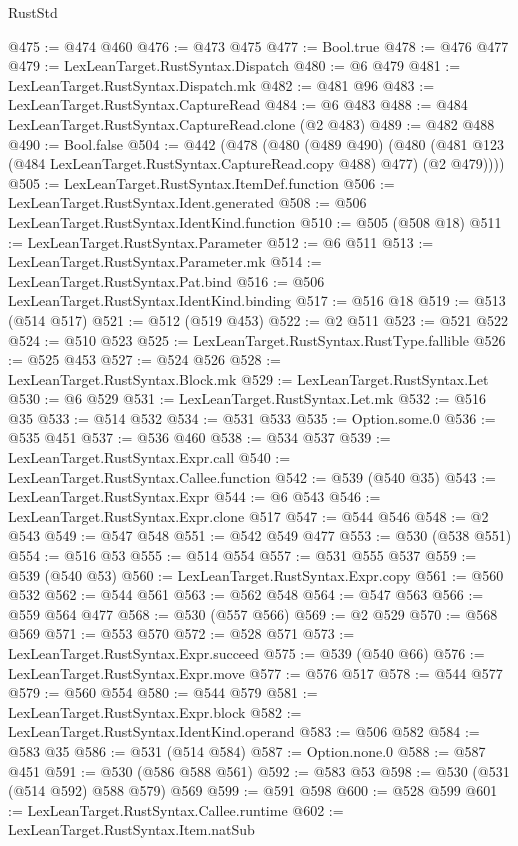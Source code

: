 \begin{lexlean}{RustStd}
\begin{coremodule}
@475 := @474 @460
@476 := @473 @475
@477 := Bool.true
@478 := @476 @477
@479 := LexLeanTarget.RustSyntax.Dispatch
@480 := @6 @479
@481 := LexLeanTarget.RustSyntax.Dispatch.mk
@482 := @481 @96
@483 := LexLeanTarget.RustSyntax.CaptureRead
@484 := @6 @483
@488 := @484 LexLeanTarget.RustSyntax.CaptureRead.clone (@2 @483)
@489 := @482 @488
@490 := Bool.false
@504 := @442
    (@478
      (@480
        (@489 @490)
        (@480 (@481 @123 (@484 LexLeanTarget.RustSyntax.CaptureRead.copy @488) @477) (@2 @479))))
@505 := LexLeanTarget.RustSyntax.ItemDef.function
@506 := LexLeanTarget.RustSyntax.Ident.generated
@508 := @506 LexLeanTarget.RustSyntax.IdentKind.function
@510 := @505 (@508 @18)
@511 := LexLeanTarget.RustSyntax.Parameter
@512 := @6 @511
@513 := LexLeanTarget.RustSyntax.Parameter.mk
@514 := LexLeanTarget.RustSyntax.Pat.bind
@516 := @506 LexLeanTarget.RustSyntax.IdentKind.binding
@517 := @516 @18
@519 := @513 (@514 @517)
@521 := @512 (@519 @453)
@522 := @2 @511
@523 := @521 @522
@524 := @510 @523
@525 := LexLeanTarget.RustSyntax.RustType.fallible
@526 := @525 @453
@527 := @524 @526
@528 := LexLeanTarget.RustSyntax.Block.mk
@529 := LexLeanTarget.RustSyntax.Let
@530 := @6 @529
@531 := LexLeanTarget.RustSyntax.Let.mk
@532 := @516 @35
@533 := @514 @532
@534 := @531 @533
@535 := Option.some.{0}
@536 := @535 @451
@537 := @536 @460
@538 := @534 @537
@539 := LexLeanTarget.RustSyntax.Expr.call
@540 := LexLeanTarget.RustSyntax.Callee.function
@542 := @539 (@540 @35)
@543 := LexLeanTarget.RustSyntax.Expr
@544 := @6 @543
@546 := LexLeanTarget.RustSyntax.Expr.clone @517
@547 := @544 @546
@548 := @2 @543
@549 := @547 @548
@551 := @542 @549 @477
@553 := @530 (@538 @551)
@554 := @516 @53
@555 := @514 @554
@557 := @531 @555 @537
@559 := @539 (@540 @53)
@560 := LexLeanTarget.RustSyntax.Expr.copy
@561 := @560 @532
@562 := @544 @561
@563 := @562 @548
@564 := @547 @563
@566 := @559 @564 @477
@568 := @530 (@557 @566)
@569 := @2 @529
@570 := @568 @569
@571 := @553 @570
@572 := @528 @571
@573 := LexLeanTarget.RustSyntax.Expr.succeed
@575 := @539 (@540 @66)
@576 := LexLeanTarget.RustSyntax.Expr.move
@577 := @576 @517
@578 := @544 @577
@579 := @560 @554
@580 := @544 @579
@581 := LexLeanTarget.RustSyntax.Expr.block
@582 := LexLeanTarget.RustSyntax.IdentKind.operand
@583 := @506 @582
@584 := @583 @35
@586 := @531 (@514 @584)
@587 := Option.none.{0}
@588 := @587 @451
@591 := @530 (@586 @588 @561)
@592 := @583 @53
@598 := @530 (@531 (@514 @592) @588 @579) @569
@599 := @591 @598
@600 := @528 @599
@601 := LexLeanTarget.RustSyntax.Callee.runtime
@602 := LexLeanTarget.RustSyntax.Item.natSub

\end{coremodule}
\end{lexlean}

